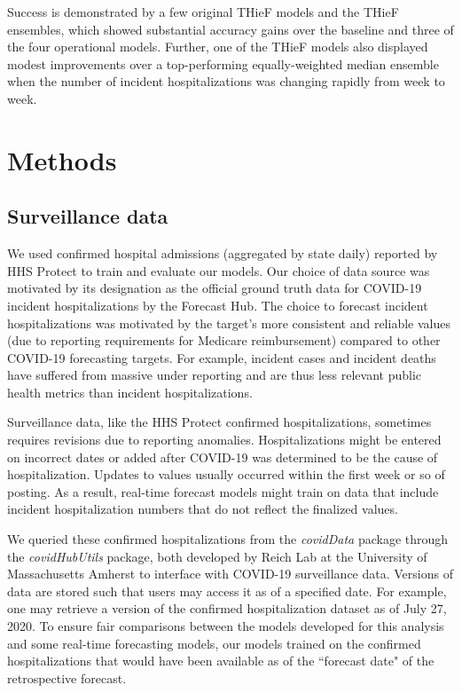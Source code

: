 \documentclass[12pt]{article}
\begin{document}
Success is demonstrated by a few original THieF models and the THieF ensembles, which showed substantial accuracy gains over the baseline and three of the four operational models. Further, one of the THieF models also displayed modest improvements over a top-performing equally-weighted median ensemble when the number of incident hospitalizations was changing rapidly from week to week.

\section{Methods} \label{methods}
\subsection{Surveillance data} \label{surveillance_data}

We used confirmed hospital admissions (aggregated by state daily) reported by HHS Protect to train and evaluate our models\cite{hhs_data}. Our choice of data source was motivated by its designation as the official ground truth data for COVID-19 incident hospitalizations by the Forecast Hub\cite{hub_data_repo}. The choice to forecast incident hospitalizations was motivated by the target's more consistent and reliable values (due to reporting requirements for Medicare reimbursement) compared to other COVID-19 forecasting targets. For example, incident cases and incident deaths have suffered from massive under reporting and are thus less relevant public health metrics than incident hospitalizations\cite{mech_bayes, jhu_covid, lauer}.

Surveillance data, like the HHS Protect confirmed hospitalizations, sometimes requires revisions due to reporting anomalies. Hospitalizations might be entered on incorrect dates or added after COVID-19 was determined to be the cause of hospitalization. Updates to values usually occurred within the first week or so of posting. As a result, real-time forecast models might train on data that include incident hospitalization numbers that do not reflect the finalized values.

We queried these confirmed hospitalizations from the \textit{covidData} package through the \textit{covidHubUtils} package, both developed by Reich Lab at the University of Massachusetts Amherst to interface with COVID-19 surveillance data. Versions of data are stored such that users may access it as of a specified date\cite{hub_data_research}. For example, one may retrieve a version of the confirmed hospitalization dataset as of July 27, 2020. To ensure fair comparisons between the models developed for this analysis and some real-time forecasting models, our models trained on the confirmed hospitalizations that would have been available as of the ``forecast date" of the retrospective forecast.
\end{document}
